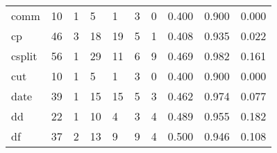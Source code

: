 \begin{longtable}{lp{1.3cm}p{1.3cm}p{1.3cm}p{1.3cm}p{1.3cm}p{1.3cm}p{1.3cm}p{1.3cm}p{1.3cm}}
comm      &                     10 &                                             1 &                                            5 &                                           1 &                                            3 &                                          0 &                                0.400 &                                  0.900 &                                0.000 \\
cp        &                     46 &                                             3 &                                           18 &                                          19 &                                            5 &                                          1 &                                0.408 &                                  0.935 &                                0.022 \\
csplit    &                     56 &                                             1 &                                           29 &                                          11 &                                            6 &                                          9 &                                0.469 &                                  0.982 &                                0.161 \\
cut       &                     10 &                                             1 &                                            5 &                                           1 &                                            3 &                                          0 &                                0.400 &                                  0.900 &                                0.000 \\
date      &                     39 &                                             1 &                                           15 &                                          15 &                                            5 &                                          3 &                                0.462 &                                  0.974 &                                0.077 \\
dd        &                     22 &                                             1 &                                           10 &                                           4 &                                            3 &                                          4 &                                0.489 &                                  0.955 &                                0.182 \\
df        &                     37 &                                             2 &                                           13 &                                           9 &                                            9 &                                          4 &                                0.500 &                                  0.946 &                                0.108 \\

\end{longtable}
